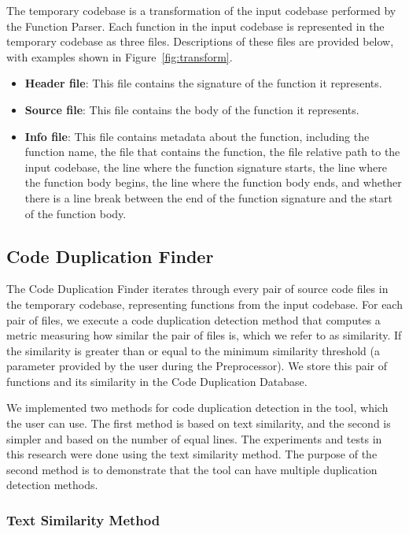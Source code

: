 The temporary codebase is a transformation of the input codebase performed by the Function Parser. Each function in the input codebase is represented in the temporary codebase as three files. Descriptions of these files are provided below, with examples shown in Figure~\ref{fig:transform}.

\begin{itemize}
	\item \textbf{Header file}: This file contains the signature of the function it represents.
	\item \textbf{Source file}: This file contains the body of the function it represents.
	\item \textbf{Info file}: This file contains metadata about the function, including the function name, the file that contains the function, the file relative path to the input codebase, the line where the function signature starts, the line where the function body begins, the line where the function body ends, and whether there is a line break between the end of the function signature and the start of the function body.
\end{itemize}

\subsection{Code Duplication Finder}
\label{subsec:code_finder}

The Code Duplication Finder iterates through every pair of source code files in the temporary codebase, representing functions from the input codebase. For each pair of files, we execute a code duplication detection method that computes a metric measuring how similar the pair of files is, which we refer to as similarity. 
If the similarity is greater than or equal to the minimum similarity threshold 
(a parameter provided by the user during the Preprocessor). We store this pair of functions and its 
similarity in the Code Duplication Database.

We implemented two methods for code duplication detection in the tool, which the user can 
use. The first method is based on text similarity, and the second is simpler and 
based on the number of equal lines. The experiments and tests in this research were done 
using the text similarity method. The purpose of the second method is to demonstrate that 
the tool can have multiple duplication detection methods.

\subsubsection{Text Similarity Method}

